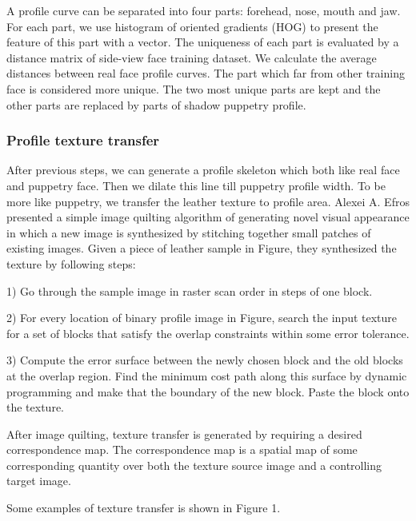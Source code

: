 \documentclass[letter]{sig-alternate}
\begin{document}
A profile curve can be separated into four parts: forehead, nose, mouth and jaw. For each part, we use histogram of oriented gradients (HOG) \cite{hog} to present the feature of this part with a vector. The uniqueness of each part is evaluated by a distance matrix of side-view face training dataset. We calculate the average distances between real face profile curves. The part which far from other training face is considered more unique. The two most unique parts are kept and the other parts are replaced by parts of shadow puppetry profile.


\subsubsection{Profile texture transfer}
After previous steps, we can generate a profile skeleton which both like real face and puppetry face. Then we dilate this line till puppetry profile width. To be more like puppetry, we transfer the leather texture to profile area. Alexei A. Efros \cite{efros2001image} presented a simple image quilting algorithm of generating novel visual appearance in which a new image is synthesized by stitching together small patches of existing images. Given a piece of leather sample in Figure, they synthesized the texture by following steps:

1) Go through the sample image in raster scan order in steps of one block.

2) For every location of binary profile image in Figure, search the input texture for a set of blocks that satisfy the overlap constraints within some error tolerance. 

3) Compute the error surface between the newly chosen block and the old blocks at the overlap region. Find the minimum cost path along this surface by dynamic programming and make that the boundary of the new block. Paste the block onto the texture. 

After image quilting, texture transfer is generated by requiring a desired correspondence map. The correspondence map is a spatial map of some corresponding quantity over both the texture source image and a controlling target image.

Some examples of texture transfer is shown in Figure 1.
\end{document}
